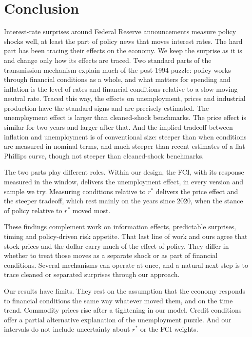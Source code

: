 \documentclass[11pt]{article}
\newcommand{\rs}{r^{*}}
\begin{document}
\section{Conclusion}
Interest-rate surprises around Federal Reserve announcements measure policy shocks well, at least the part of policy news that moves interest rates. The hard part has been tracing their effects on the economy. We keep the surprise as it is and change only how its effects are traced. Two standard parts of the transmission mechanism explain much of the post-1994 puzzle: policy works through financial conditions as a whole, and what matters for spending and inflation is the level of rates and financial conditions relative to a slow-moving neutral rate. Traced this way, the effects on unemployment, prices and industrial production have the standard signs and are precisely estimated. The unemployment effect is larger than cleaned-shock benchmarks. The price effect is similar for two years and larger after that. And the implied tradeoff between inflation and unemployment is of conventional size: steeper than when conditions are measured in nominal terms, and much steeper than recent estimates of a flat Phillips curve, though not steeper than cleaned-shock benchmarks.

The two parts play different roles. Within our design, the FCI, with its response measured in the window, delivers the unemployment effect, in every version and sample we try. Measuring conditions relative to $\rs$ delivers the price effect and the steeper tradeoff, which rest mainly on the years since 2020, when the stance of policy relative to $\rs$ moved most.

These findings complement work on information effects, predictable surprises, timing and policy-driven risk appetite. That last line of work and ours agree that stock prices and the dollar carry much of the effect of policy. They differ in whether to treat those moves as a separate shock or as part of financial conditions. Several mechanisms can operate at once, and a natural next step is to trace cleaned or separated surprises through our approach.

Our results have limits. They rest on the assumption that the economy responds to financial conditions the same way whatever moved them, and on the time trend. Commodity prices rise after a tightening in our model. Credit conditions offer a partial alternative explanation of the unemployment puzzle. And our intervals do not include uncertainty about $\rs$ or the FCI weights.
\end{document}
